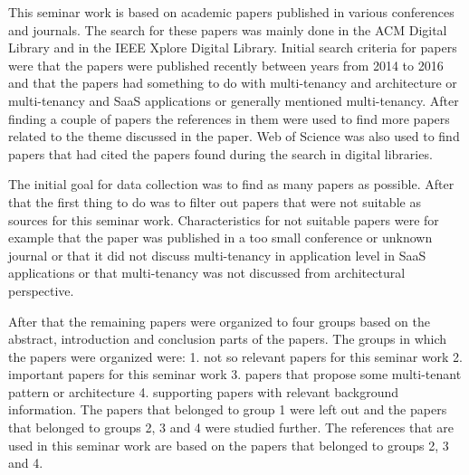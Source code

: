 \documentclass[conference]{sasmoota2017}
\begin{document}
%



This seminar work is based on academic papers published in various conferences and journals. The search for these papers was mainly done in the ACM Digital Library and in the IEEE Xplore Digital Library. Initial search criteria for papers were that the papers were published recently between years from 2014 to 2016 and that the papers had something to do with multi-tenancy and architecture or multi-tenancy and SaaS applications or generally mentioned multi-tenancy. After finding a couple of papers the references in them were used to find more papers related to the theme discussed in the paper. Web of Science was also used to find papers that had cited the papers found during the search in digital libraries. 

The initial goal for data collection was to find as many papers as possible. After that the first thing to do was to filter out papers that were not suitable as sources for this seminar work. Characteristics for not suitable papers were for example that the paper was published in a too small conference or unknown journal or that it did not discuss multi-tenancy in application level in SaaS applications or that multi-tenancy was not discussed from architectural perspective. 

After that the remaining papers were organized to four groups based on the abstract, introduction and conclusion parts of the papers. The groups in which the papers were organized were: 1. not so relevant papers for this seminar work 2. important papers for this seminar work 3. papers that propose some multi-tenant pattern or architecture 4. supporting papers with relevant background information. The papers that belonged to group 1 were left out and the papers that belonged to groups 2, 3 and 4 were studied further. The references that are used in this seminar work are based on the papers that belonged to groups 2, 3 and 4.
\end{document}
